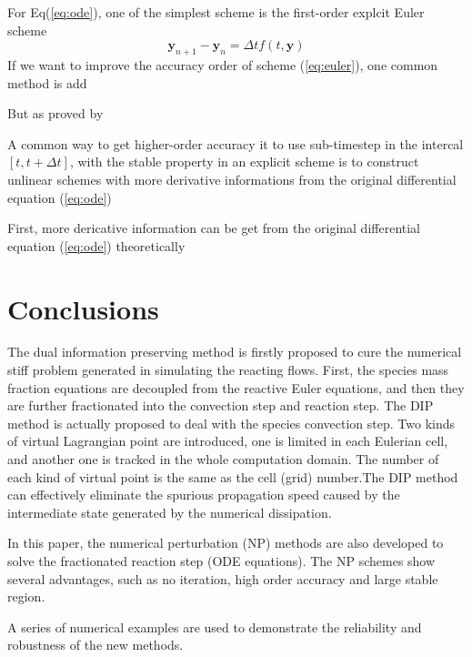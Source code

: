 \documentclass[review]{elsarticle}
\theoremstyle{plain}\newtheorem{definition}{\sc{Definition}}
\theoremstyle{defination}\newtheorem{example}{Example}[section]
\numberwithin{equation}{section}
\numberwithin{table}{section}
\begin{document}
For Eq(\ref{eq:ode}), one of  the simplest scheme is the first-order explcit Euler scheme  
\begin{equation}\label{eq:euler}
  \bm{y}_{n+1}- \bm{y}_n = \Delta t f(t,\bm{y})
\end{equation}
If we want to improve the accuracy order of scheme (\ref{eq:euler}),  one common method is add 

But as proved by  

A common way to get higher-order accuracy it to use sub-timestep in the intercal $[t,t+\Delta t]$,    with the stable property in an explicit scheme  is to construct unlinear schemes with more derivative informations from the original differential equation (\ref{eq:ode}) 

First, more dericative information can be get from the original differential equation (\ref{eq:ode}) theoretically 








   



\section{Conclusions}

The dual information preserving method is firstly proposed to cure the numerical stiff problem generated in simulating the reacting flows. First, the species mass fraction equations are decoupled from the reactive Euler equations, and then they are further fractionated into the convection step and reaction step. The DIP method is actually proposed to deal with the species convection step. Two kinds of virtual Lagrangian point are introduced, one is limited in each Eulerian cell, and another one is tracked in the whole computation domain. The number of each kind of virtual point is the same as the cell (grid) number.The DIP method can effectively eliminate the spurious propagation speed caused by the intermediate state generated by the numerical dissipation.

In this paper, the numerical perturbation (NP) methods are also developed to solve the fractionated reaction step (ODE equations). The NP schemes show several advantages, such as no iteration, high order accuracy and large stable region.  

A series of numerical examples are used to demonstrate the reliability and robustness of the new methods.
\end{document}
